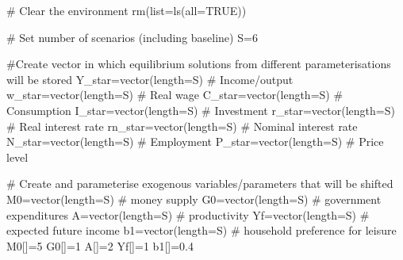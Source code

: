 \documentclass[
  letterpaper,
  DIV=11,
  numbers=noendperiod]{scrreprt}
\newenvironment{Shaded}{\begin{snugshade}}{\end{snugshade}}
\newcommand{\AttributeTok}[1]{\textcolor[rgb]{0.40,0.45,0.13}{#1}}
\newcommand{\CommentTok}[1]{\textcolor[rgb]{0.37,0.37,0.37}{#1}}
\newcommand{\ConstantTok}[1]{\textcolor[rgb]{0.56,0.35,0.01}{#1}}
\newcommand{\DecValTok}[1]{\textcolor[rgb]{0.68,0.00,0.00}{#1}}
\newcommand{\FloatTok}[1]{\textcolor[rgb]{0.68,0.00,0.00}{#1}}
\newcommand{\FunctionTok}[1]{\textcolor[rgb]{0.28,0.35,0.67}{#1}}
\newcommand{\NormalTok}[1]{\textcolor[rgb]{0.00,0.23,0.31}{#1}}
\newcommand{\OtherTok}[1]{\textcolor[rgb]{0.00,0.23,0.31}{#1}}
\begin{document}
\begin{Shaded}
\begin{Highlighting}[]
\CommentTok{\# Clear the environment}
\FunctionTok{rm}\NormalTok{(}\AttributeTok{list=}\FunctionTok{ls}\NormalTok{(}\AttributeTok{all=}\ConstantTok{TRUE}\NormalTok{))}

\CommentTok{\# Set number of scenarios (including baseline)}
\NormalTok{S}\OtherTok{=}\DecValTok{6}

\CommentTok{\#Create vector in which equilibrium solutions from different parameterisations will be stored}
\NormalTok{Y\_star}\OtherTok{=}\FunctionTok{vector}\NormalTok{(}\AttributeTok{length=}\NormalTok{S) }\CommentTok{\# Income/output}
\NormalTok{w\_star}\OtherTok{=}\FunctionTok{vector}\NormalTok{(}\AttributeTok{length=}\NormalTok{S) }\CommentTok{\# Real wage}
\NormalTok{C\_star}\OtherTok{=}\FunctionTok{vector}\NormalTok{(}\AttributeTok{length=}\NormalTok{S) }\CommentTok{\# Consumption}
\NormalTok{I\_star}\OtherTok{=}\FunctionTok{vector}\NormalTok{(}\AttributeTok{length=}\NormalTok{S) }\CommentTok{\# Investment}
\NormalTok{r\_star}\OtherTok{=}\FunctionTok{vector}\NormalTok{(}\AttributeTok{length=}\NormalTok{S) }\CommentTok{\# Real interest rate}
\NormalTok{rn\_star}\OtherTok{=}\FunctionTok{vector}\NormalTok{(}\AttributeTok{length=}\NormalTok{S) }\CommentTok{\# Nominal interest rate}
\NormalTok{N\_star}\OtherTok{=}\FunctionTok{vector}\NormalTok{(}\AttributeTok{length=}\NormalTok{S) }\CommentTok{\# Employment}
\NormalTok{P\_star}\OtherTok{=}\FunctionTok{vector}\NormalTok{(}\AttributeTok{length=}\NormalTok{S) }\CommentTok{\# Price level}

\CommentTok{\# Create and parameterise exogenous variables/parameters that will be shifted}
\NormalTok{M0}\OtherTok{=}\FunctionTok{vector}\NormalTok{(}\AttributeTok{length=}\NormalTok{S) }\CommentTok{\# money supply}
\NormalTok{G0}\OtherTok{=}\FunctionTok{vector}\NormalTok{(}\AttributeTok{length=}\NormalTok{S) }\CommentTok{\# government expenditures}
\NormalTok{A}\OtherTok{=}\FunctionTok{vector}\NormalTok{(}\AttributeTok{length=}\NormalTok{S)  }\CommentTok{\# productivity}
\NormalTok{Yf}\OtherTok{=}\FunctionTok{vector}\NormalTok{(}\AttributeTok{length=}\NormalTok{S) }\CommentTok{\# expected future income}
\NormalTok{b1}\OtherTok{=}\FunctionTok{vector}\NormalTok{(}\AttributeTok{length=}\NormalTok{S) }\CommentTok{\# household preference for leisure}
\NormalTok{M0[]}\OtherTok{=}\DecValTok{5}
\NormalTok{G0[]}\OtherTok{=}\DecValTok{1}
\NormalTok{A[]}\OtherTok{=}\DecValTok{2}
\NormalTok{Yf[]}\OtherTok{=}\DecValTok{1}
\NormalTok{b1[]}\OtherTok{=}\FloatTok{0.4}


\end{Highlighting}
\end{Shaded}
\end{document}
